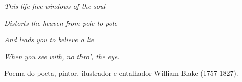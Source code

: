 \begin{reflection}{}

\begin{DUlineblock}{0em}
\item[] \emph{This life five windows of the soul}
\item[] \emph{Distorts the heaven from pole to pole}
\item[] \emph{And leads you to believe a lie}
\item[] \emph{When you see with, no thro’, the eye.}
\end{DUlineblock}

Poema do poeta, pintor, ilustrador e entalhador William Blake (1757-1827).
\end{reflection}


\label{\detokenize{GE301-2:explorando-projecoes-em-perspectiva-e-projecoes-paralelas}}\label{\detokenize{GE301-2::doc}}\label{\detokenize{GE301-2:ativ-proj-luz-e-sombras}}
